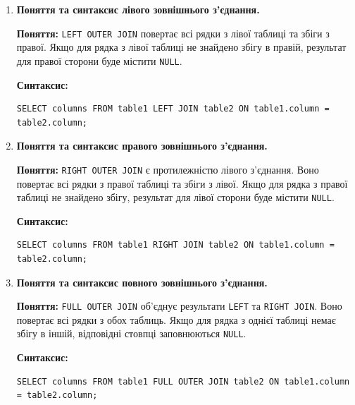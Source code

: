 \documentclass{article}
\begin{document}
\begin{enumerate}[label=\arabic*., leftmargin=*]
        \item \textbf{Поняття та синтаксис лівого зовнішнього з’єднання.}
        
        \textbf{Поняття:} \texttt{LEFT OUTER JOIN} повертає всі рядки з лівої таблиці та збіги з правої. Якщо для рядка з лівої таблиці не знайдено збігу в правій, результат для правої сторони буде містити \texttt{NULL}.
        
        \textbf{Синтаксис:}
        \begin{CodeBox}
        \begin{verbatim}
SELECT columns FROM table1 LEFT JOIN table2 ON table1.column = table2.column;
        \end{verbatim}
        \end{CodeBox}

        \item \textbf{Поняття та синтаксис правого зовнішнього з’єднання.}
        
        \textbf{Поняття:} \texttt{RIGHT OUTER JOIN} є протилежністю лівого з'єднання. Воно повертає всі рядки з правої таблиці та збіги з лівої. Якщо для рядка з правої таблиці не знайдено збігу, результат для лівої сторони буде містити \texttt{NULL}.
        
        \textbf{Синтаксис:}
        \begin{CodeBox}
        \begin{verbatim}
SELECT columns FROM table1 RIGHT JOIN table2 ON table1.column = table2.column;
        \end{verbatim}
        \end{CodeBox}

        \item \textbf{Поняття та синтаксис повного зовнішнього з’єднання.}
        
        \textbf{Поняття:} \texttt{FULL OUTER JOIN} об'єднує результати \texttt{LEFT} та \texttt{RIGHT JOIN}. Воно повертає всі рядки з обох таблиць. Якщо для рядка з однієї таблиці немає збігу в іншій, відповідні стовпці заповнюються \texttt{NULL}.
        
        \textbf{Синтаксис:}
        \begin{CodeBox}
        \begin{verbatim}
SELECT columns FROM table1 FULL OUTER JOIN table2 ON table1.column = table2.column;
        \end{verbatim}
        \end{CodeBox}
        
    \end{enumerate}
\end{document}
